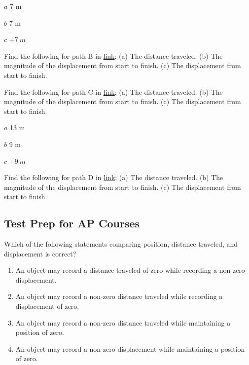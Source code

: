 \documentclass[
]{book}
\providecommand{\tightlist}{%
  \setlength{\itemsep}{0pt}\setlength{\parskip}{0pt}}
\begin{document}
\leavevmode{}%
\(a\) 7 m

\(b\) 7 m

\(c\) \({+ 7\ m}{}\)

\hypertarget{fs-id2823990}{}
\leavevmode{}%
Find the following for path B in
\protect\hyperlink{import-auto-id2076702}{link}: (a) The distance
traveled. (b) The magnitude of the displacement from start to finish.
(c) The displacement from start to finish.

\hypertarget{fs-id4292134}{}
\leavevmode{}%
Find the following for path C in
\protect\hyperlink{import-auto-id2076702}{link}: (a) The distance
traveled. (b) The magnitude of the displacement from start to finish.
(c) The displacement from start to finish.

\leavevmode{}%
\(a\) 13 m

\(b\) 9 m

\(c\) \({+ 9\ m}{}\)

\hypertarget{fs-id3242594}{}
\leavevmode{}%
Find the following for path D in
\protect\hyperlink{import-auto-id2076702}{link}: (a) The distance
traveled. (b) The magnitude of the displacement from start to finish.
(c) The displacement from start to finish.

\hypertarget{fs-id1915464}{}
\hypertarget{test-prep-for-ap-courses}{%
\subsection{Test Prep for AP Courses}\label{test-prep-for-ap-courses}}

\hypertarget{fs-id1862594}{}
\leavevmode{}%
Which of the following statements comparing position, distance traveled,
and displacement is correct?

\begin{enumerate}
\def\labelenumi{\alph{enumi}.}
\tightlist
\item
  An object may record a distance traveled of zero while recording a
  non-zero displacement.
\item
  An object may record a non-zero distance traveled while recording a
  displacement of zero.
\item
  An object may record a non-zero distance traveled while maintaining
  a position of zero.
\item
  An object may record a non-zero displacement while maintaining a
  position of zero.
\end{enumerate}
\end{document}
